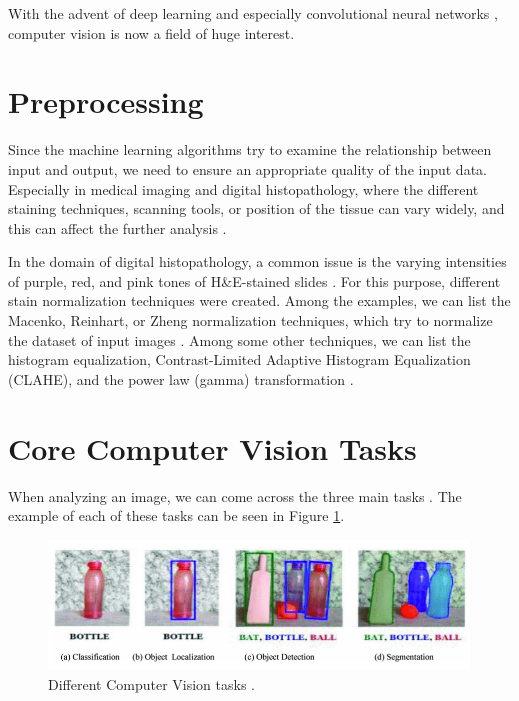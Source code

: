 With the advent of deep learning \cite{LeCun2015} and especially convolutional neural networks \cite{Ronneberger2015}, computer vision is now a field of huge interest.

\section{Preprocessing}
Since the machine learning algorithms try to examine the relationship between input and output, we need to ensure an appropriate quality of the input data. Especially in medical imaging and digital histopathology, where the different staining techniques, scanning tools, or position of the tissue can vary widely, and this can affect the further analysis \cite{Hoque2024}.

In the domain of digital histopathology, a common issue is the varying intensities of purple, red, and pink tones of H\&E-stained slides \cite{Hoque2024}. For this purpose, different stain normalization techniques were created. Among the examples, we can list the Macenko, Reinhart, or Zheng normalization techniques, which try to normalize the dataset of input images \cite{Hoque2024}. Among some other techniques, we can list the histogram equalization, Contrast-Limited Adaptive Histogram Equalization (CLAHE), and the power law (gamma) transformation \cite{Dabass2020}.

\section{Core Computer Vision Tasks}
When analyzing an image, we can come across the three main tasks \cite{Alam2021}. The example of each of these tasks can be seen in Figure \ref{fig:aiml-tasks}.

\begin{figure}[H]
\begin{centering}
\includegraphics[width=12cm]{assets/images/aiml-tasks.png}
\par\end{centering}
\caption{Different Computer Vision tasks \cite{Alam2021}.}
\label{fig:aiml-tasks}
\end{figure}

